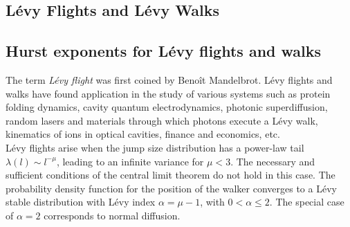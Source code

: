 \documentclass[12pt]{report}
\begin{document}
\begin{justify}
\chapter{L\'evy Flights and L\'evy Walks}

\section{Hurst exponents for L\'evy flights and walks}
The term \textit{L\'evy flight} was first coined by  Beno\^{i}t Mandelbrot. L\'evy flights and walks have found application in the study of various systems such as protein folding dynamics, cavity quantum electrodynamics, photonic superdiffusion, random lasers and materials through which photons execute a L\'evy walk, kinematics of ions in optical cavities, finance and economics, etc.\\

L\'evy flights arise when the jump size distribution has a power-law tail $\lambda(l) \sim l^{-\mu}$, leading to an infinite variance for $\mu < 3 $. The necessary and sufficient conditions of the central limit theorem do not hold in this case. The probability density function for the position of the walker converges to a L\'evy stable distribution with L\'evy index $\alpha = \mu - 1$, with $0 < \alpha \leq 2$. The special case of $\alpha = 2$ corresponds to normal diffusion.\\


\end{justify}
\end{document}
